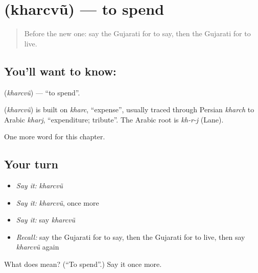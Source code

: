 \section[\texorpdfstring{\gu{ખર્ચવું} (kharcvũ)}{ખર્ચવું (kharcvũ)}]{ (kharcvũ) — to spend}

\label{lesson:GU-C142-kharcvu}



\begin{quote}
Before the new one: say the Gujarati for to say, then the Gujarati for to live.
\end{quote}

\subsection*{You'll want to know: }
\textbf{} (\emph{kharcvũ}) — \textquotedblleft{}to spend\textquotedblright{}.

\begin{cousinweb}
\textbf{} (\emph{kharcvũ}) is built on \emph{kharc}, \textquotedblleft{}expense\textquotedblright{}, usually traced through Persian \emph{kharch} to Arabic \emph{kharj}, \textquotedblleft{}expenditure; tribute\textquotedblright{}. The Arabic root is \emph{kh-r-j} (Lane).
\end{cousinweb}

\begin{grammarlens}[title={What you've built}]
One more word for this chapter.
\end{grammarlens}

\subsection*{Your turn}
\begin{itemize}
\raggedright
  \item \emph{Say it:} \emph{kharcvũ}
  \item \emph{Say it:} \emph{kharcvũ}, once more
  \item \emph{Say it:} say \emph{kharcvũ}
  \item \emph{Recall:} say the Gujarati for to say, then the Gujarati for to live, then say \emph{kharcvũ} again
\end{itemize}

\begin{tcolorbox}[breakable,colback=teal!4,colframe=teal!35!black,title={Before you move on}]
What does  mean? (\textquotedblleft{}To spend\textquotedblright{}.) Say it once more.
\end{tcolorbox}
